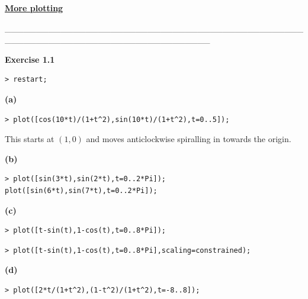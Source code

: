 \documentclass{article}
\begin{document}
\lstset{basicstyle=\ttfamily,breaklines=true,columns=flexible}
\pagestyle{empty}
\begin{center}
\begin{Maple Normal}
\underline{\textbf{More plotting}}
\end{Maple Normal}
\end{center}
\begin{Maple Normal}
\_\_\_\_\_\_\_\_\_\_\_\_\_\_\_\_\_\_\_\_\_\_\_\_\_\_\_\_\_\_\_\_\_\_\_\_\_\_\_\_\_\_\_\_\_\_\_\_\_\_\_\_\_\_\_\_\_\_\_\_\_\_\_\_\_\_\_\_\_\_\_\_\_\_\_\_\_\_\_\_\_
\end{Maple Normal}
\begin{Maple Normal}
\textbf{Exercise 1.1}
\end{Maple Normal}
\begin{lstlisting}
> restart;
\end{lstlisting}
\textbf{(a)}\begin{lstlisting}
> plot([cos(10*t)/(1+t^2),sin(10*t)/(1+t^2),t=0..5]);
\end{lstlisting}
\begin{Maple Normal}
This starts at 
$ (1,0) $ and moves anticlockwise spiralling in towards the origin.
\end{Maple Normal}
\textbf{(b)}\begin{lstlisting}
> plot([sin(3*t),sin(2*t),t=0..2*Pi]);
plot([sin(6*t),sin(7*t),t=0..2*Pi]);
\end{lstlisting}
\textbf{(c)}\begin{lstlisting}
> plot([t-sin(t),1-cos(t),t=0..8*Pi]);
\end{lstlisting}
\begin{lstlisting}
> plot([t-sin(t),1-cos(t),t=0..8*Pi],scaling=constrained);
\end{lstlisting}
\textbf{(d)}\begin{lstlisting}
> plot([2*t/(1+t^2),(1-t^2)/(1+t^2),t=-8..8]);
\end{lstlisting}
\end{document}
